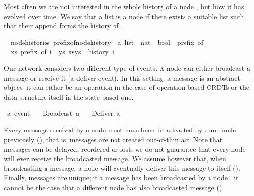 \documentclass[acmlarge,review,anonymous]{acmart}\settopmatter{printfolios=true}
\begin{document}
Most often we are not interested in the whole history of a node , but
how it has evolved over time. We say that a list  is a 
node  if there exists a suitable list  such that their append
forms the history of .

\begin{isabellebody}
\isanewline
{}\isamarkupfalse%
\ {\isacharparenleft}\ node{\isacharunderscore}histories{\isacharparenright}\ prefix{\isacharunderscore}of{\isacharunderscore}node{\isacharunderscore}history\ {\isacharcolon}{\isacharcolon}\ {\isachardoublequoteopen}{\isacharprime}a\ list\ {\isasymRightarrow}\ nat\ {\isasymRightarrow}\ bool{\isachardoublequoteclose}\ {\isacharparenleft}\ {\isachardoublequoteopen}prefix\ of{\isachardoublequoteclose}\ {}{}{\isacharparenright}\ \isanewline
\ \ {\isachardoublequoteopen}xs\ prefix\ of\ i\ {\isasymequiv}\ {\isasymexists}ys{\isachardot}\ xs{\isacharat}ys\ {\isacharequal}\ history\ i{\isachardoublequoteclose}\isanewline
\end{isabellebody}

Our network considers two different type of events. A node can either broadcast
a message or receive it (a deliver event). In this setting, a message is an
abstract object, it can either be an operation in the case of operation-based
CRDTs or the data structure itself in the state-based one.

\begin{isabellebody}
\isanewline
{}\isamarkupfalse%
\ {\isacharprime}a\ event\isanewline
\ \ {\isacharequal}\ Broadcast\ {\isacharprime}a\isanewline
\ \ {\isacharbar}\ Deliver\ {\isacharprime}a\isanewline
\end{isabellebody}

Every message received by a node must have been broadcasted by some node
previously (), that is, messages are not created
out-of-thin air. Note that messages can be delayed, reordered or lost, we do
not guarantee that every node will ever receive the broadcasted message. We
assume however that, when broadcasting a message, a node will eventually
deliver this message to itself (). Finally, messages are
unique; if a message  has been broadcasted by a node , it cannot
be the case that a different node  has also broadcasted message 
().
\end{document}
